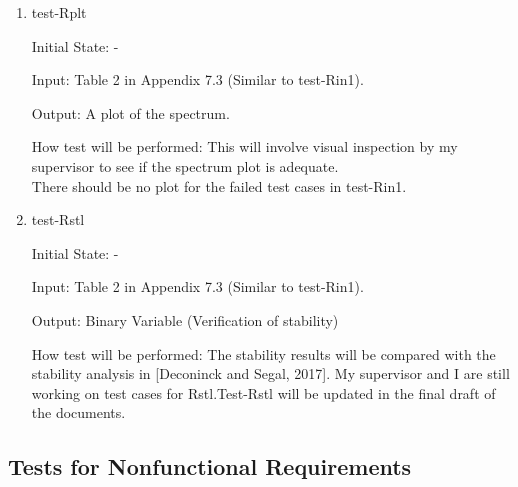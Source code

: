 \documentclass[12pt, titlepage]{article}
\begin{document}
\begin{enumerate}
\item{test-Rplt} 

Initial State: -

Input: Table 2 in Appendix 7.3 (Similar to test-Rin1).

Output: A plot of the spectrum.

How test will be performed: This will involve visual inspection by my 
supervisor to see if the spectrum plot is adequate. \\
There should be no plot for the failed test cases in test-Rin1. 

\item{test-Rstl} 

Initial State: -

Input: Table 2 in Appendix 7.3 (Similar to test-Rin1).

Output: Binary Variable (Verification of stability) 

How test will be performed: The stability results will be compared with the 
stability analysis in [Deconinck and Segal, 2017].  My supervisor 
and I are still working on test cases for Rstl.Test-Rstl will be updated in 
the final draft of the documents. 

\end{enumerate}

\subsection{Tests for Nonfunctional Requirements}
\end{document}
